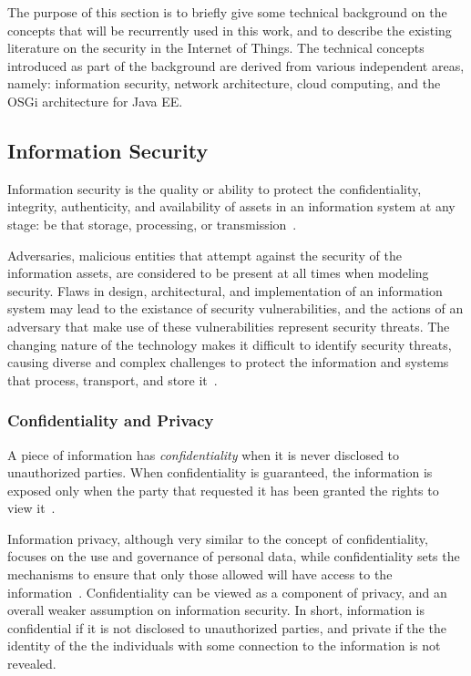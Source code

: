\documentclass[12pt]{article}
\begin{document}
The purpose of this section is to briefly give some technical background on the concepts that will be recurrently used in this work, and to describe the existing literature on the security in the Internet of Things. The technical concepts introduced as part of the background are derived from various independent areas, namely: information security, network architecture, cloud computing, and the OSGi architecture for Java EE.

\subsection{Information Security}

Information security is the quality or ability to protect the confidentiality, integrity, authenticity, and availability of assets in an information system at any stage: be that storage, processing, or transmission~\cite{whitman2011principles}.

Adversaries, malicious entities that attempt against the security of the information assets, are considered to be present at all times when modeling security. Flaws in design, architectural, and implementation of an information system may lead to the existance of security vulnerabilities, and the actions of an adversary that make use of these vulnerabilities represent security threats. The changing nature of the technology makes it difficult to identify security threats, causing diverse and complex challenges to protect the information and systems that process, transport, and store it~\cite{whitman2003}.

\subsubsection{Confidentiality and Privacy}

A piece of information has \emph{confidentiality} when it is never disclosed to unauthorized parties. When confidentiality is guaranteed, the information is exposed only when the party that requested it has been granted the rights to view it~\cite{whitman2011principles}.

Information privacy, although very similar to the concept of confidentiality, focuses on the use and governance of personal data, while confidentiality sets the mechanisms to ensure that only those allowed will have access to the information~\cite{heckman}. Confidentiality can be viewed as a component of privacy, and an overall weaker assumption on information security. In short, information is confidential if it is not disclosed to unauthorized parties, and private if the the identity of the the individuals with some connection to the information is not revealed.
\end{document}
